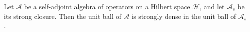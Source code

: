 Let $\mathcal{A}$ be a self-adjoint algebra of operators on a Hilbert space $\mathcal{H}$, and let $\mathcal{A}_s$ be its strong closure. Then the unit ball of $\mathcal{A}$ is strongly dense in the unit ball of $\mathcal{A}_s$.
